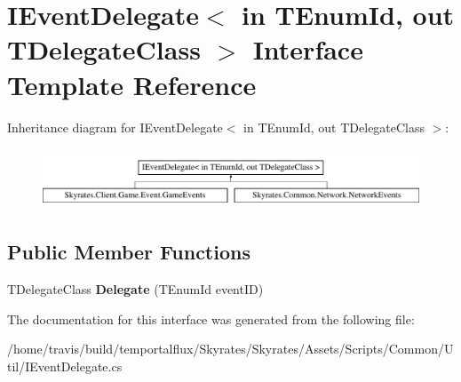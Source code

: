 \hypertarget{interface_i_event_delegate_3_01in_01_t_enum_id_00_01out_01_t_delegate_class_01_4}{\section{I\-Event\-Delegate$<$ in T\-Enum\-Id, out T\-Delegate\-Class $>$ Interface Template Reference}
\label{interface_i_event_delegate_3_01in_01_t_enum_id_00_01out_01_t_delegate_class_01_4}
}
Inheritance diagram for I\-Event\-Delegate$<$ in T\-Enum\-Id, out T\-Delegate\-Class $>$\-:\begin{figure}[H]
\begin{center}
\leavevmode
\includegraphics[height=1.800643cm]{interface_i_event_delegate_3_01in_01_t_enum_id_00_01out_01_t_delegate_class_01_4}
\end{center}
\end{figure}
\subsection*{Public Member Functions}
\begin{DoxyCompactItemize}
\item 
\hypertarget{interface_i_event_delegate_3_01in_01_t_enum_id_00_01out_01_t_delegate_class_01_4_afd5ee1abc156ef7976a91e1caeb073d5}{T\-Delegate\-Class {\bfseries Delegate} (T\-Enum\-Id event\-I\-D)}\label{interface_i_event_delegate_3_01in_01_t_enum_id_00_01out_01_t_delegate_class_01_4_afd5ee1abc156ef7976a91e1caeb073d5}

\end{DoxyCompactItemize}


The documentation for this interface was generated from the following file\-:\begin{DoxyCompactItemize}
\item 
/home/travis/build/temportalflux/\-Skyrates/\-Skyrates/\-Assets/\-Scripts/\-Common/\-Util/I\-Event\-Delegate.\-cs\end{DoxyCompactItemize}

